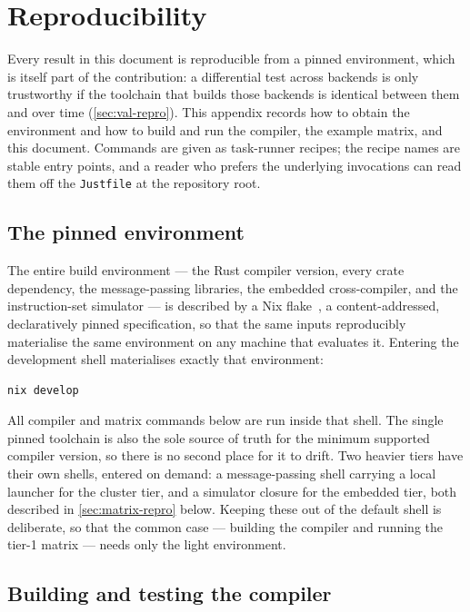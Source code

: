 \chapter{Reproducibility}\label{app:reproducibility}

Every result in this document is reproducible from a pinned environment, which
is itself part of the contribution: a differential test across backends is only
trustworthy if the toolchain that builds those backends is identical between them
and over time (\cref{sec:val-repro}). This appendix records how to obtain the
environment and how to build and run the compiler, the example matrix, and this
document. Commands are given as task-runner recipes; the recipe names are stable
entry points, and a reader who prefers the underlying invocations can read them off
the \texttt{Justfile} at the repository root.

\section{The pinned environment}

The entire build environment --- the Rust compiler version, every crate dependency,
the message-passing libraries, the embedded cross-compiler, and the instruction-set
simulator --- is described by a Nix flake~\cite{dolstra2004nix}, a content-addressed,
declaratively pinned specification, so that the same inputs reproducibly
materialise the same environment on any machine that evaluates it. Entering the
development shell materialises exactly that environment:

\begin{verbatim}
nix develop
\end{verbatim}

All compiler and matrix commands below are run inside that shell. The single pinned
toolchain is also the sole source of truth for the minimum supported compiler
version, so there is no second place for it to drift. Two heavier tiers have their
own shells, entered on demand: a message-passing shell carrying a local launcher
for the cluster tier, and a simulator closure for the embedded tier, both described
in \cref{sec:matrix-repro} below. Keeping these out of the default shell is
deliberate, so that the common case --- building the compiler and running the
tier-1 matrix --- needs only the light environment.

\section{Building and testing the compiler}

